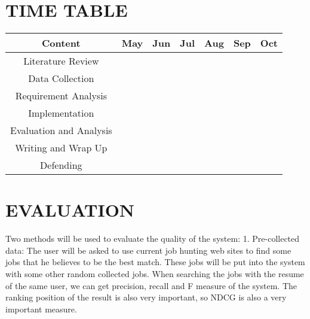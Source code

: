 \section{TIME TABLE}
\begin{center}
\begin{tabular}{ |c|p{1cm}|p{1cm}|p{1cm}|p{1cm}|p{1cm}|p{1cm}| }
 \hline
  Content                 & May              & Jun             & Jul              & Aug             & Sep             & Oct  \\ \hline
  Literature Review       & \cellcolor{red}  & \cellcolor{red} &                  &                 &                 &      \\ \hline
  Data Collection         &                  & \cellcolor{red} & \cellcolor{red}  &                 &                 &      \\ \hline
  Requirement Analysis    &                  &                 & \cellcolor{red}  &                 &                 &      \\ \hline
  Implementation          &                  &                 &                  & \cellcolor{red} &                 &      \\ \hline
  Evaluation and Analysis &                  &                 &                  &                 & \cellcolor{red} &   \\ \hline
  Writing and Wrap Up     &                  &                 &                  &      & \cellcolor{red} & \cellcolor{red}     \\ \hline
  Defending               &                  &                 &                  &                 &     &  \cellcolor{red}    \\ \hline


 \hline
\end{tabular}
\end{center}

 


\section{EVALUATION}

Two methods will be used to evaluate the quality of the system:
1.	Pre-collected data: The user will be asked to use current job hunting web sites to find some jobs that he believes to be the best match. These jobs will be put into the system with some other random collected jobs.  When searching the jobs with the resume of the same user, we can get precision, recall and F measure of the system. The ranking position of the result is also very important, so NDCG is also a very important measure.

